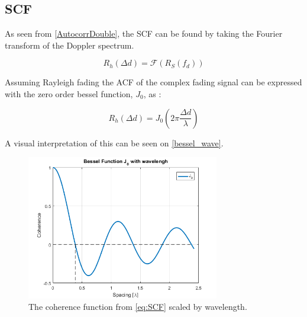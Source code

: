 



\subsection{\Gls{SCF}}
As seen from \autoref{AutocorrDouble}, the SCF can be found by taking the Fourier transform of the Doppler spectrum. 

\begin{equation}
R_{h}(\Delta d) = \mathcal{F}(R_{S}(f_d))
\end{equation}

Assuming Rayleigh fading the ACF of the complex fading signal can be expressed with the zero order bessel function, $J_0$, as \citep[p.329]{Jakes_microwave}:

\begin{equation}\label{eq:SCF}
R_h(\Delta d) = J_0\left(2\pi \frac{\Delta d}{\lambda}\right)
\end{equation}

A visual interpretation of this can be seen on \autoref{bessel_wave}.

\begin{figure}[H]
\centering
\includegraphics[width=0.75\textwidth]{figures/Bessel_wavlength.png}
\caption{The coherence function from \autoref{eq:SCF} scaled by wavelength.}
\label{bessel_wave}
\end{figure}

